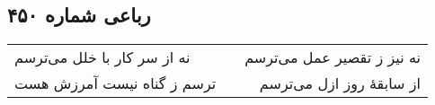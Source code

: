 \begin{center}
\section*{رباعی شماره ۴۵۰}
\label{sec:sh450}
\begin{longtable}{l p{0.5cm} r}
نه از سر کار با خلل می‌ترسم
&&
نه نیز ز تقصیر عمل می‌ترسم
\\
ترسم ز گناه نیست آمرزش هست
&&
از سابقهٔ روز ازل می‌ترسم
\\
\end{longtable}
\end{center}
